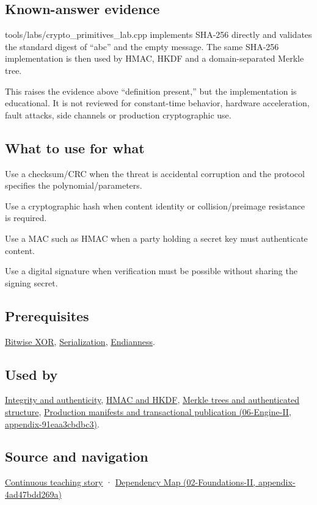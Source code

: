 \subsection{Known-answer evidence}\label{appendix-ed338677de0a-known-answer-evidence}

tools/labs/crypto\_primitives\_lab.cpp implements SHA-256 directly and validates the standard digest of ``abc'' and the empty message. The same SHA-256 implementation is then used by HMAC, HKDF and a domain-separated Merkle tree.

This raises the evidence above ``definition present,'' but the implementation is educational. It is not reviewed for constant-time behavior, hardware acceleration, fault attacks, side channels or production cryptographic use.

\subsection{What to use for what}\label{appendix-ed338677de0a-what-to-use-for-what}

Use a checksum/CRC when the threat is accidental corruption and the protocol specifies the polynomial/parameters.

Use a cryptographic hash when content identity or collision/preimage resistance is required.

Use a MAC such as HMAC when a party holding a secret key must authenticate content.

Use a digital signature when verification must be possible without sharing the signing secret.

\subsection{Prerequisites}\label{appendix-ed338677de0a-prerequisites}

\hyperref[appendix-d49161831368]{Bitwise XOR}, \hyperref[appendix-91d09ebed979]{Serialization}, \hyperref[appendix-bc07c3d25b18]{Endianness}.

\subsection{Used by}\label{appendix-ed338677de0a-used-by}

\hyperref[appendix-cbe594d1ab0a]{Integrity and authenticity}, \hyperref[appendix-50af792c9da7]{HMAC and HKDF}, \hyperref[appendix-098192f8d46d]{Merkle trees and authenticated structure}, \href{../06-Engine-II/main.pdf\#nameddest=appendix-91eaa3cbdbc3}{Production manifests and transactional publication (06-Engine-II, appendix-91eaa3cbdbc3)}.

\subsection{Source and navigation}\label{appendix-ed338677de0a-source-and-navigation}

\hyperref[01-foundations-i-ch002-bytes-become-a-durable-agreement]{Continuous teaching story} · \href{../02-Foundations-II/main.pdf\#nameddest=appendix-4ad47bdd269a}{Dependency Map (02-Foundations-II, appendix-4ad47bdd269a)}

